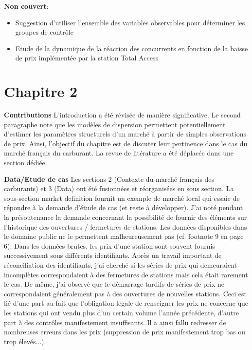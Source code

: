 \documentclass[11pt]{article}
\begin{document}
\medskip

\textbf{Non couvert}:
\begin{itemize}
\item Suggestion d'utiliser l'ensemble des variables observables pour déterminer les groupes de contrôle
\item Etude de la dynamique de la réaction des concurrents en fonction de la baisse de prix implémentée par la station Total Access
\end{itemize}

\section{Chapitre 2}

\textbf{Contributions} L'introduction a été révisée de manière significative. Le second paragraphe note que les modèles de dispersion permettent potentiellement d'estimer les paramètres structurels d'un marché à partir de simples observations de prix. Ainsi, l'objectif du chapitre est de discuter leur pertinence dans le cas du marché français du carburant. La revue de litérature a été déplacée dans une section dédiée.

\medskip

\textbf{Data/Etude de cas} Les sections 2 (Contexte du marché français des carburants) et 3 (Data) ont été fusionnées et réorganisées en sous section. La sous-section market definition fournit un exemple de marché local qui essaie de répondre à la demande d'étude de cas (et reste à développer). J'ai noté pendant la présoutenance la demande concernant la possibilité de fournir des éléments sur l'historique des ouvertures / fermetures de stations. Les données disponibles dans le domaine public ne le permettent malheureusement pas (cf. footnote 9 en page 6). Dans les données brutes, les prix d'une station sont souvent fournis successivement sous différents identifiants. Après un travail important de réconciliation des identifiants, j'ai cherché si les séries de prix qui demeuraient incomplètes correspondaient à des fermetures de stations mais cela était rarement le cas. De même, j'ai observé que le démarrage tardifs de séries de prix ne correspondaient généralement pas à des ouvertures de nouvelles stations. Ceci est lié d'une part au fait que l'obligation légale de renseigner les prix ne concerne que les stations qui ont vendu plus d'un certain volume l'année précédente, d'autre part à des contrôles manifestement insuffisants. Il a ainsi fallu redresser de nombreuses erreurs dans les prix (suppression de prix manifestement trop bas ou trop élevés...).
\end{document}
